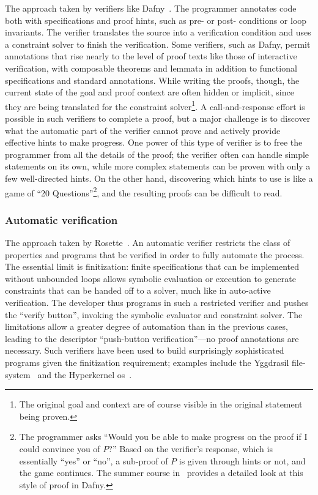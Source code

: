 The approach taken by verifiers like Dafny~\cite{leino2010dafny}. The programmer
annotates code both with specifications and proof hints, such as pre- or post-
conditions or loop invariants. The verifier translates the source into a
verification condition and uses a constraint solver to finish the verification.
Some verifiers, such as Dafny, permit annotations that rise nearly to the level of
proof texts like those of interactive verification, with composable theorems and
lemmata in addition to functional specifications and standard annotations. While
writing the proofs, though, the current state of the  goal and proof context are
often hidden or implicit, since they are being translated for the constraint
solver\footnote{The original goal and context are of course visible in the
original statement being proven.}. A call-and-response effort is possible in
such verifiers to complete a proof, but a major challenge is to discover what the
automatic part of the verifier cannot prove and actively provide effective hints
to make progress. One power of this type of verifier is to free the programmer
from all the details of the proof; the verifier often can handle simple
statements on its own, while more complex statements can be proven with only a
few well-directed hints. On the other hand, discovering which hints to use is
like a game of ``20 Questions''\footnote{The programmer asks ``Would you be able
to make progress on the proof if I could convince you of \(P\)?'' Based on the
verifier's response, which is essentially ``yes'' or ``no'', a sub-proof of
\(P\) is given through hints or not, and the game continues. The summer course
in~\cite{Kapritsos_2020} provides a detailed look at this style of proof in
Dafny.}, and the resulting proofs can be difficult to read.

\subsubsection{Automatic verification}

The approach taken by Rosette~\cite{Torlak_2013}. An automatic verifier
restricts the class of properties and programs that be verified in order to
fully automate the process. The essential limit is finitization: finite
specifications that can be implemented without unbounded loops allows symbolic
evaluation or execution to generate constraints that can be handed off to a
solver, much like in auto-active verification. The developer thus programs in
such a restricted verifier and pushes the ``verify button'', invoking the symbolic
evaluator and constraint solver. The limitations allow a greater degree of
automation than in the previous cases, leading to the descriptor ``push-button
verification''---no proof annotations are necessary. Such verifiers have been used
to build surprisingly sophisticated programs given the finitization requirement;
examples include the Yggdrasil file-system~\cite{Sigurbjarnarson_2016} and the
Hyperkernel \gls{os}~\cite{Nelson_2017}.

